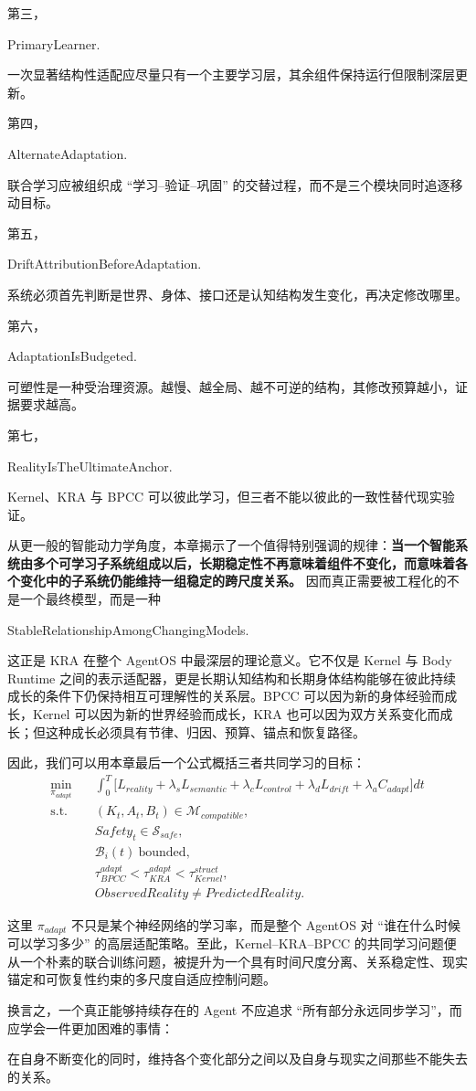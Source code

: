 第三，
\begin{statementbox}
PrimaryLearner.
\end{statementbox}
一次显著结构性适配应尽量只有一个主要学习层，其余组件保持运行但限制深层更新。

第四，
\begin{statementbox}
AlternateAdaptation.
\end{statementbox}
联合学习应被组织成 ``学习--验证--巩固'' 的交替过程，而不是三个模块同时追逐移动目标。

第五，
\begin{statementbox}
DriftAttributionBeforeAdaptation.
\end{statementbox}
系统必须首先判断是世界、身体、接口还是认知结构发生变化，再决定修改哪里。

第六，
\begin{statementbox}
AdaptationIsBudgeted.
\end{statementbox}
可塑性是一种受治理资源。越慢、越全局、越不可逆的结构，其修改预算越小，证据要求越高。

第七，
\begin{statementbox}
RealityIsTheUltimateAnchor.
\end{statementbox}
Kernel、KRA 与 BPCC 可以彼此学习，但三者不能以彼此的一致性替代现实验证。

从更一般的智能动力学角度，本章揭示了一个值得特别强调的规律：\textbf{当一个智能系统由多个可学习子系统组成以后，长期稳定性不再意味着组件不变化，而意味着各个变化中的子系统仍能维持一组稳定的跨尺度关系。} 因而真正需要被工程化的不是一个最终模型，而是一种
\begin{statementbox}
StableRelationshipAmongChangingModels.
\end{statementbox}

这正是 KRA 在整个 AgentOS 中最深层的理论意义。它不仅是 Kernel 与 Body Runtime 之间的表示适配器，更是长期认知结构和长期身体结构能够在彼此持续成长的条件下仍保持相互可理解性的关系层。BPCC 可以因为新的身体经验而成长，Kernel 可以因为新的世界经验而成长，KRA 也可以因为双方关系变化而成长；但这种成长必须具有节律、归因、预算、锚点和恢复路径。

因此，我们可以用本章最后一个公式概括三者共同学习的目标：
\[
\boxed{
\begin{aligned}
\min_{\pi_{adapt}}
\quad&
\int_{0}^{T}
\Big[
L_{reality}
+
\lambda_s L_{semantic}
+
\lambda_c L_{control}
+
\lambda_d L_{drift}
+
\lambda_a C_{adapt}
\Big]dt
\\
\text{s.t.}\quad&
(K_t,A_t,B_t)\in\mathcal M_{compatible},
\\
&
Safety_t\in\mathcal S_{safe},
\\
&
\mathcal B_i(t)\ \text{bounded},
\\
&
\tau_{BPCC}^{adapt}
<
\tau_{KRA}^{adapt}
<
\tau_{Kernel}^{struct},
\\
&
ObservedReality
\neq
PredictedReality.
\end{aligned}
}
\]

这里 $\pi_{adapt}$ 不只是某个神经网络的学习率，而是整个 AgentOS 对 ``谁在什么时候可以学习多少'' 的高层适配策略。至此，Kernel--KRA--BPCC 的共同学习问题便从一个朴素的联合训练问题，被提升为一个具有时间尺度分离、关系稳定性、现实锚定和可恢复性约束的多尺度自适应控制问题。

换言之，一个真正能够持续存在的 Agent 不应追求 ``所有部分永远同步学习''，而应学会一件更加困难的事情：

\begin{statementbox}
在自身不断变化的同时，维持各个变化部分之间以及自身与现实之间那些不能失去的关系。
\end{statementbox}
